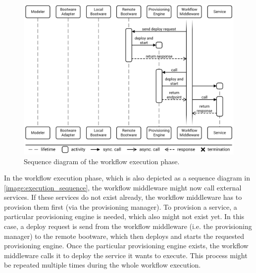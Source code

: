 \begin{figure}[!htbp]
	\centering
	\includegraphics[resolution=600]{process/assets/workflow_execution_sequence}
	\caption{Sequence diagram of the workflow execution phase.}
	\label{image:execution_sequence}
\end{figure}

In the workflow execution phase, which is also depicted as a sequence diagram in \autoref{image:execution_sequence}, the workflow middleware might now call external services.
If these services do not exist already, the workflow middleware has to provision them first (via the provisioning manager).
To provision a service, a particular provisioning engine is needed, which also might not exist yet.
In this case, a deploy request is send from the workflow middleware (i.e. the provisioning manager) to the remote bootware, which then deploys and starts the requested provisioning engine.
Once the particular provisioning engine exists, the workflow middleware calls it to deploy the service it wants to execute.
This process might be repeated multiple times during the whole workflow execution.

